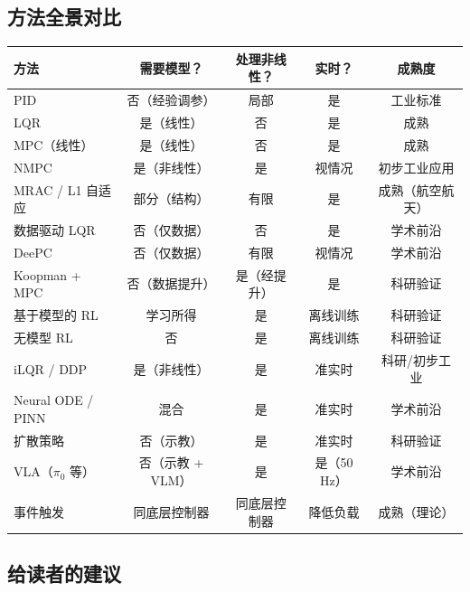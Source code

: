 \subsection{方法全景对比}

\begin{center}
\footnotesize
\begin{tabular}{l c c c c}
\toprule
\textbf{方法} & \textbf{需要模型？} & \textbf{处理非线性？} & \textbf{实时？} & \textbf{成熟度} \\
\midrule
PID & 否（经验调参） & 局部 & 是 & 工业标准 \\
LQR & 是（线性） & 否 & 是 & 成熟 \\
MPC（线性） & 是（线性） & 否 & 是 & 成熟 \\
NMPC & 是（非线性） & 是 & 视情况 & 初步工业应用 \\
MRAC / L1 自适应 & 部分（结构） & 有限 & 是 & 成熟（航空航天） \\
数据驱动 LQR & 否（仅数据） & 否 & 是 & 学术前沿 \\
DeePC & 否（仅数据） & 有限 & 视情况 & 学术前沿 \\
Koopman + MPC & 否（数据提升） & 是（经提升） & 是 & 科研验证 \\
基于模型的 RL & 学习所得 & 是 & 离线训练 & 科研验证 \\
无模型 RL & 否 & 是 & 离线训练 & 科研验证 \\
iLQR / DDP & 是（非线性） & 是 & 准实时 & 科研/初步工业 \\
Neural ODE / PINN & 混合 & 是 & 准实时 & 学术前沿 \\
扩散策略 & 否（示教） & 是 & 准实时 & 科研验证 \\
VLA（$\pi_0$ 等） & 否（示教 + VLM） & 是 & 是（50 Hz） & 学术前沿 \\
事件触发 & 同底层控制器 & 同底层控制器 & 降低负载 & 成熟（理论） \\
\bottomrule
\end{tabular}
\end{center}

\subsection{给读者的建议}

